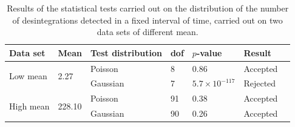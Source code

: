 \begin{table}[htbp]
    \centering
    \begin{tabular}{lllllll}
        \hline
        Data set & Mean & Test distribution & dof & $p$-value & Result \\
        \hline
        \multirow{2}{*}{Low mean} & \multirow{2}{*}{2.27} & Poisson & 8 & 0.86 & Accepted\\
        & & Gaussian & 7 & $5.7 \times 10^{-117}$ & Rejected \\
        \multirow{2}{*}{High mean} & \multirow{2}{*}{228.10} & Poisson & 91 & 0.38 & Accepted\\
        & & Gaussian & 90 & 0.26 & Accepted\\
        \hline
    \end{tabular}
    \caption{Results of the statistical tests carried out on 
    the distribution of the number of desintegrations detected 
    in a fixed interval of time, carried out on two data sets 
    of different mean.}
    \label{tab:statistical_tests}
\end{table}

